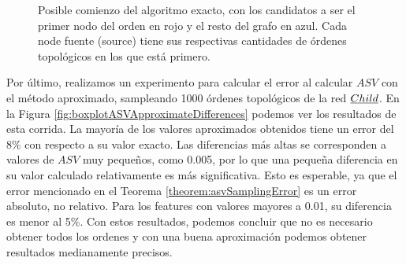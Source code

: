 \begin{figure}[ht]
	\centering
	\caption{Posible comienzo del algoritmo exacto, con los candidatos a ser el primer nodo del orden en rojo y el resto del grafo en azul. Cada node fuente (source) tiene sus respectivas cantidades de órdenes topológicos en los que está primero.}
	\label{fig:badExactToposortExample}
\end{figure}

Por último, realizamos un experimento para calcular el error al calcular $ASV$ con el método aproximado, sampleando 1000 órdenes topológicos de la red $\emph{Child}$. En la Figura \ref{fig:boxplotASVApproximateDifferences} podemos ver los resultados de esta corrida. La mayoría de los valores aproximados obtenidos tiene un error del 8\% con respecto a su valor exacto. Las diferencias más altas se corresponden a valores de $ASV$ muy pequeños, como 0.005, por lo que una pequeña diferencia en su valor calculado relativamente es más significativa. Esto es esperable, ya que el error mencionado en el Teorema \ref{theorem:asvSamplingError} es un error absoluto, no relativo. Para los features con valores mayores a 0.01, su diferencia es menor al 5\%.
Con estos resultados, podemos concluir que no es necesario obtener todos los ordenes y con una buena aproximación podemos obtener resultados medianamente precisos. 


